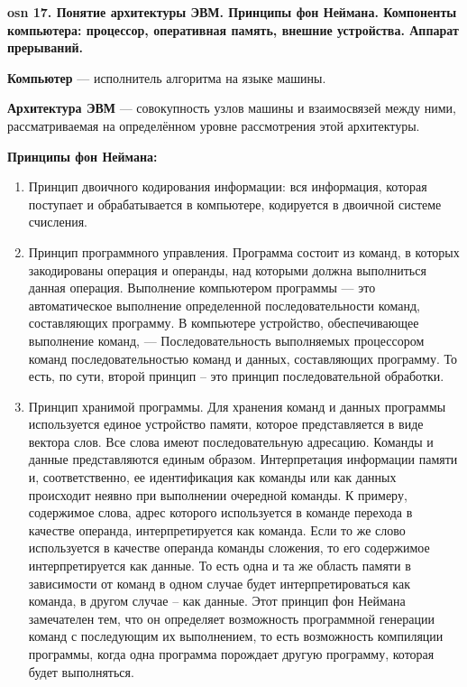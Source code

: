 \setcounter{section}{15}
\setcounter{subsection}{17}
\setcounter{equation}{0}
\textbf{\LARGE osn 17. Понятие архитектуры ЭВМ. Принципы фон Неймана. Компоненты компьютера: процессор, оперативная память, внешние устройства. Аппарат прерываний.}


\textbf{Компьютер} --- исполнитель алгоритма на языке машины.

\textbf{Архитектура ЭВМ} --- совокупность узлов машины и взаимосвязей между ними, рассматриваемая на определённом уровне рассмотрения этой архитектуры.

\textbf{Принципы фон Неймана:}
\begin{enumerate}
    \item Принцип двоичного кодирования информации: вся информация, которая поступает и обрабатывается в компьютере, кодируется в двоичной системе счисления.
    \item Принцип программного управления. Программа состоит из команд, в которых закодированы операция и операнды, над которыми должна выполниться данная операция. Выполнение компьютером программы — это автоматическое выполнение определенной последовательности команд, составляющих программу. В компьютере устройство, обеспечивающее выполнение команд, — Последовательность выполняемых процессором команд последовательностью команд и данных, составляющих программу. То есть, по сути, второй принцип – это принцип последовательной обработки.
    \item Принцип хранимой программы. Для хранения команд и данных программы используется единое устройство памяти, которое представляется в виде вектора слов. Все слова имеют последовательную адресацию. Команды и данные представляются единым образом. Интерпретация информации памяти и, соответственно, ее идентификация как команды или как данных происходит неявно при выполнении очередной команды. К примеру, содержимое слова, адрес которого используется в команде перехода в качестве операнда, интерпретируется как команда. Если то же слово используется в качестве операнда команды сложения, то его содержимое интерпретируется как данные. То есть одна и та же область памяти в зависимости от команд в одном случае будет интерпретироваться как команда, в другом случае – как данные. Этот принцип фон Неймана замечателен тем, что он определяет возможность программной генерации команд с последующим их выполнением, то есть возможность компиляции программы, когда одна программа порождает другую программу, которая будет выполняться.
\end{enumerate}

